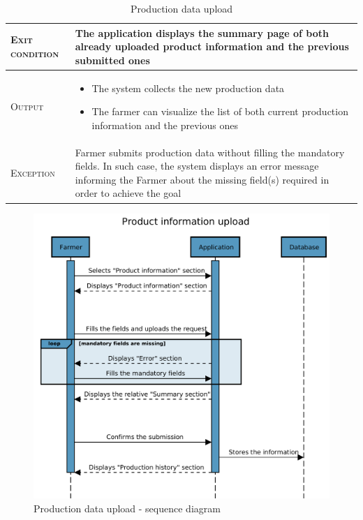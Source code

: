 \begin{table}[H]
\begin{tabular}[c]{|l|m{}|}
        \textsc{Exit condition}    &  The application displays the summary page of both already uploaded product information and the previous submitted ones\\
    	\hline %
    	\textsc{Output}             &  \begin{itemize}
    	    \item The system collects the new production data
    	    \item The farmer can visualize the list of both current production information and the previous ones
    	\end{itemize}\\
    	\hline %
    	\textsc{Exception}         &  Farmer submits production data without filling the mandatory fields. In such case, the system displays an error message informing the Farmer about the missing field(s) required in order to achieve the goal\\
    	\hline %
        
    \end{tabular}
    \caption{\label{tab:Production_data_submission}Production data upload}
\end{table}

\newpage


\begin{figure}[H]
	\centering
    \includegraphics[page=1, width=\textwidth]{Images/SeqDiag/product_info_upload_seq_diag.pdf}
	\caption{\label{fig:product_info_seq_diag}Production data upload - sequence diagram}
\end{figure}


